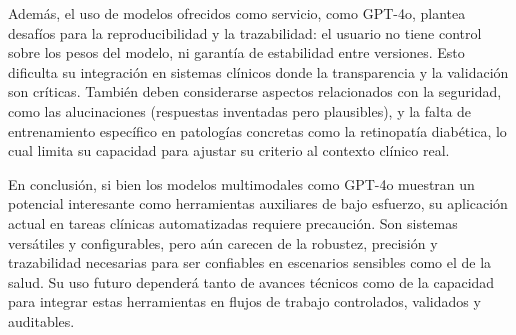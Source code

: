 Además, el uso de modelos ofrecidos como servicio, como GPT-4o, plantea desafíos para la reproducibilidad y la trazabilidad: el usuario no tiene control sobre los pesos del modelo, ni garantía de estabilidad entre versiones. Esto dificulta su integración en sistemas clínicos donde la transparencia y la validación son críticas. También deben considerarse aspectos relacionados con la seguridad, como las alucinaciones (respuestas inventadas pero plausibles), y la falta de entrenamiento específico en patologías concretas como la retinopatía diabética, lo cual limita su capacidad para ajustar su criterio al contexto clínico real.

En conclusión, si bien los modelos multimodales como GPT-4o muestran un potencial interesante como herramientas auxiliares de bajo esfuerzo, su aplicación actual en tareas clínicas automatizadas requiere precaución. Son sistemas versátiles y configurables, pero aún carecen de la robustez, precisión y trazabilidad necesarias para ser confiables en escenarios sensibles como el de la salud. Su uso futuro dependerá tanto de avances técnicos como de la capacidad para integrar estas herramientas en flujos de trabajo controlados, validados y auditables.